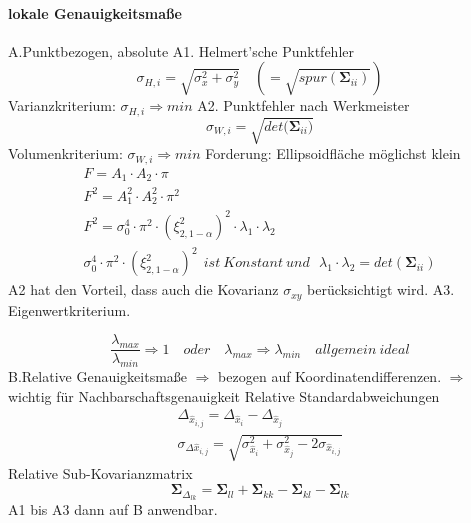 \documentclass[12pt]{article}
\begin{document}
\paragraph{lokale Genauigkeitsmaße}
\noindent A.Punktbezogen, absolute
\newline
A1. Helmert'sche Punktfehler
\begin{equation*}
\sigma_{H,i} = \sqrt{\sigma_x^2 + \sigma_y^2} \quad (= \sqrt{spur(\bm{\Sigma}_{ii})})
\end{equation*}
Varianzkriterium: $\sigma_{H,i} \Rightarrow min$
\newline
A2. Punktfehler nach Werkmeister
\begin{equation*}
\sigma_{W,i} = \sqrt{det({\bm{\Sigma}_{ii})}}
\end{equation*}
Volumenkriterium: $\sigma_{W,i} \Rightarrow min$
\newline
Forderung: Ellipsoidfläche möglichst klein
\begin{gather*}
F = A_1 \cdot A_2 \cdot \pi \\
F^2 = A_1^2 \cdot A_2^2 \cdot \pi^2 \\
F^2 = \sigma_0^4 \cdot \pi^2 \cdot (\xi_{2,1-\alpha}^2)^2 \cdot \lambda_1 \cdot \lambda_2 \\
\sigma_0^4 \cdot \pi^2 \cdot (\xi_{2,1-\alpha}^2)^2\ \ ist\  Konstant\  und\ \ \  \lambda_1 \cdot \lambda_2 = det(\bm{\Sigma}_{ii})
\end{gather*}
A2 hat den Vorteil, dass auch die Kovarianz $\sigma_{xy}$ berücksichtigt wird.
\newpage
\noindent A3. Eigenwertkriterium.
\begin{figure}[ht]\centering
{}
\end{figure}
\begin{equation*}
\frac{\lambda_{max}}{\lambda_{min}} \Rightarrow 1 \quad oder \quad \lambda_{max} \Rightarrow \lambda_{min} \quad allgemein \ ideal
\end{equation*}
B.Relative Genauigkeitsmaße
\newline
$\Rightarrow$ bezogen auf Koordinatendifferenzen.\newline
$\Rightarrow$ wichtig für Nachbarschaftsgenauigkeit\newline
Relative Standardabweichungen
\begin{gather*}
\Delta_{\hat{x}_{i,j}} = \Delta_{\hat{x}_{i}} - \Delta_{\hat{x}_{j}} \\
\sigma_{\Delta \hat{x}_{i,j}} = \sqrt{\sigma_{\hat{x}_i}^2 + \sigma_{\hat{x}_j}^2 - 2 \sigma_{\hat{x}_{i,j}}}
\end{gather*}
Relative Sub-Kovarianzmatrix
\begin{equation*}
\bm{\Sigma}_{\Delta_{lk}} = \bm{\Sigma}_{ll} + \bm{\Sigma}_{kk} - \bm{\Sigma}_{kl} - \bm{\Sigma}_{lk}
\end{equation*}
A1 bis A3 dann auf B anwendbar.
\end{document}
